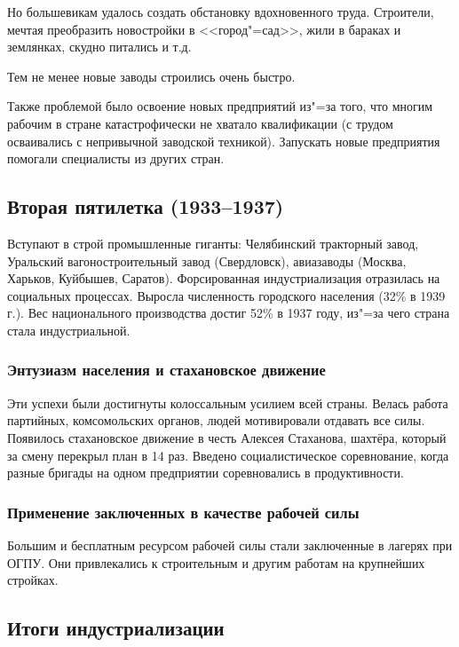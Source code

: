Но большевикам удалось создать обстановку вдохновенного труда. Строители, мечтая преобразить новостройки в <<город"=сад>>, жили в  бараках и землянках, скудно питались и т.д.

Тем не менее новые заводы строились очень быстро.

Также проблемой было освоение новых предприятий из"=за того, что многим рабочим в стране катастрофически не хватало квалификации (с трудом осваивались с непривычной заводской техникой). Запускать новые предприятия помогали специалисты из других стран.

\subsection{Вторая пятилетка (1933--1937)}

Вступают в строй промышленные гиганты: Челябинский тракторный завод, Уральский вагоностроительный завод (Свердловск), авиазаводы (Москва, Харьков, Куйбышев, Саратов).
Форсированная индустриализация отразилась на социальных процессах. Выросла численность городского населения (32\% в 1939 г.). Вес национального производства достиг 52\% в 1937 году, из"=за чего страна стала индустриальной. 

\subsubsection{\textbf{Энтузиазм населения и стахановское движение}}

Эти успехи были достигнуты колоссальным усилием всей страны. Велась работа партийных, комсомольских органов, людей мотивировали отдавать все силы. Появилось стахановское движение в честь Алексея Стаханова, шахтёра, который за смену перекрыл план в 14 раз. Введено социалистическое соревнование, когда разные бригады на одном предприятии соревновались в продуктивности.

\subsubsection{\textbf{Применение заключенных в качестве рабочей силы}}

Большим и бесплатным ресурсом рабочей силы стали заключенные в лагерях при ОГПУ. Они привлекались к строительным и другим работам на крупнейших стройках.

\subsection{Итоги индустриализации}

